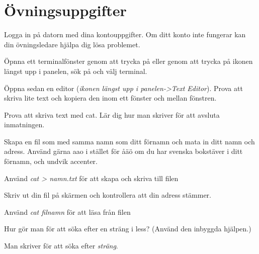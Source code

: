 \documentclass[a4paper,twocolumn]{book}
\begin{document}
\chapter{Övningsuppgifter}
\label{cha:uppgifter}

\begin{exercise}
  Logga in på datorn med dina kontouppgifter. Om ditt konto inte fungerar kan din övningsledare hjälpa dig lösa problemet.
\end{exercise}

\begin{exercise}
  Öpnna ett terminalfönster genom att trycka på  eller
  genom att trycka på ikonen längst upp i panelen, sök på  och välj terminal.

  Öppna sedan en editor (\emph{ikonen längst upp i panelen->Text Editor}).
  Prova att skriva lite text och kopiera den inom ett fönster och mellan
  fönstren.
\end{exercise}

\begin{exercise}
  Prova att skriva text med cat. Lär dig hur man
  skriver  för att avsluta inmatningen.
\end{exercise}

\begin{exercise}
  Skapa en fil som med samma namn som ditt förnamn och mata in ditt
  namn och adress. Använd gärna aao i stället för åäö om du har svenska
  bokstäver i ditt förnamn, och undvik accenter.
  \begin{answer}
    Använd \emph{cat > namn.txt} för att skapa och skriva till filen
  \end{answer}
\end{exercise}

\begin{exercise}
  Skriv ut din fil på skärmen och kontrollera att din adress stämmer.
  \begin{answer}
    Använd \emph{cat filnamn} för att läsa från filen
  \end{answer}
\end{exercise}


\begin{exercise}
  Hur gör man för att söka efter en sträng i less? (Använd den inbyggda
  hjälpen.)
  \begin{answer}
    Man skriver  för att söka efter \emph{sträng}.
  \end{answer}
\end{exercise}
\end{document}
